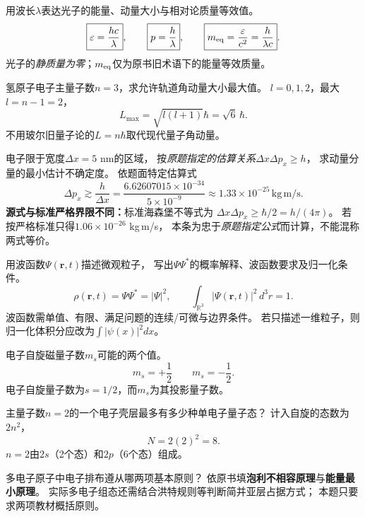 \problemtext 用波长$\lambda$表达光子的能量、动量大小与相对论质量等效值。
\workings
\[
\boxed{\varepsilon=\frac{hc}{\lambda}},\qquad
\boxed{p=\frac h\lambda},\qquad
\boxed{m_{\rm eq}=\frac{\varepsilon}{c^2}=\frac h{\lambda c}}.
\]
\crosscheck 光子的\emph{静质量为零}；$m_{\rm eq}$仅为原书旧术语下的能量等效质量。

\problemtext 氢原子电子主量子数$n=3$，求允许轨道角动量大小最大值。
\workings
$l=0,1,2$，最大$l=n-1=2$，
\[
\boxed{L_{\max}=\sqrt{l(l+1)}\hbar=\sqrt6\,\hbar}.
\]
\crosscheck 不用玻尔旧量子论的$L=n\hbar$取代现代量子角动量。

\problemtext 电子限于宽度$\Delta x=5$ nm的区域，
按\emph{原题指定的估算关系}$\Delta x\Delta p_x\ge h$，
求动量分量的最小估计不确定度。
\workings
依题面特定估算式
\[
\boxed{\Delta p_x\gtrsim\frac h{\Delta x}
=\frac{6.62607015\times10^{-34}}{5\times10^{-9}}
\approx1.33\times10^{-25}\,\mathrm{kg\,m/s}}.
\]
\crosscheck \textbf{源式与标准严格界限不同：}标准海森堡不等式为
$\Delta x\Delta p_x\ge\hbar/2=h/(4\pi)$。
若按严格标准只得$1.06\times10^{-26}$ kg\,m/s，
本条为忠于\emph{原题指定公式}而计算，不能混称两式等价。

\problemtext 用波函数$\Psi(\bm r,t)$描述微观粒子，
写出$\Psi\Psi^*$的概率解释、波函数要求及归一化条件。
\workings
\[
\boxed{\rho(\bm r,t)=\Psi\Psi^*=|\Psi|^2},\qquad
\boxed{\int_{\mathbb R^3}|\Psi(\bm r,t)|^2\,d^3r=1}.
\]
波函数需单值、有限、满足问题的连续/可微与边界条件。
\crosscheck 若只描述一维粒子，则归一化体积分应改为$\int|\psi(x)|^2dx$。

\problemtext 电子自旋磁量子数$m_s$可能的两个值。
\workings
\[
\boxed{m_s=+\frac12}\qquad\boxed{m_s=-\frac12}.
\]
\crosscheck 电子自旋量子数为$s=1/2$，而$m_s$为其投影量子数。

\problemtext 主量子数$n=2$的一个电子壳层最多有多少种单电子量子态？
\workings
计入自旋的态数为$2n^2$，
\[
\boxed{N=2(2)^2=8}.
\]
\crosscheck $n=2$由$2s$（2个态）和$2p$（6个态）组成。

\problemtext 多电子原子中电子排布遵从哪两项基本原则？
\workings
依原书填\textbf{泡利不相容原理}与\textbf{能量最小原理}。
\crosscheck 实际多电子组态还需结合洪特规则等判断简并亚层占据方式；
本题只要求两项教材概括原则。
